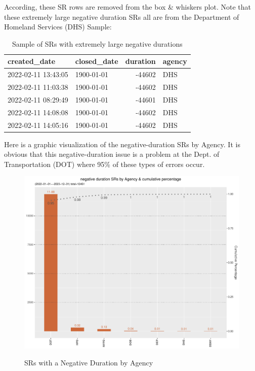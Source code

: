 \documentclass[12pt, titlepage]{article}
\begin{document}
{According, these  SR rows are removed from the box \& whiskers plot. Note that these extremely large negative duration SRs all
are from the Department of Homeland Services (DHS) Sample: 

\begin{table}[tbp]
    \centering
    \caption{Sample of SRs with extremely large negative durations}
    \small
    \begin{tabular}{l l r l}
        \toprule
        \textbf{created\_date} & \textbf{closed\_date} & \textbf{duration} & \textbf{agency} \\
	        \midrule
	        2022-02-11 13:43:05 & 1900-01-01 & -44602 & DHS \\
	        2022-02-11 11:03:38 & 1900-01-01 & -44602 & DHS \\
	        2022-02-11 08:29:49 & 1900-01-01 & -44601 & DHS \\
	        2022-02-11 14:08:08 & 1900-01-01 & -44602 & DHS \\
	        2022-02-11 14:05:16 & 1900-01-01 & -44602 & DHS \\
	        \bottomrule
    \end{tabular}
    \label{tab:extreme_negative_durations}
\end{table}

Here is a graphic visualization of the negative-duration SRs by Agency. It is obvious that this
negative-duration issue is a problem at the Dept. of Transportation (DOT) where 95\% of these
types of errors occur. 

\begin{figure}[tbp]
 	 \centering
 	 \caption{SRs with a Negative Duration by Agency}
	  \includegraphics[width = \textwidth]{negative_duration_SR_barchart.pdf}
	  \label{fig:negative-duration}
\end{figure}

}
\end{document}
